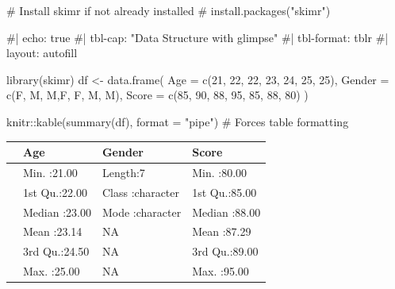\documentclass[
  man,
  floatsintext,
  longtable,
  nolmodern,
  notxfonts,
  notimes,
  colorlinks=true,linkcolor=blue,citecolor=blue,urlcolor=blue]{apa7}
\newenvironment{Shaded}{\begin{snugshade}}{\end{snugshade}}
\newcommand{\AttributeTok}[1]{\textcolor[rgb]{0.40,0.45,0.13}{#1}}
\newcommand{\CommentTok}[1]{\textcolor[rgb]{0.37,0.37,0.37}{#1}}
\newcommand{\DecValTok}[1]{\textcolor[rgb]{0.68,0.00,0.00}{#1}}
\newcommand{\FunctionTok}[1]{\textcolor[rgb]{0.28,0.35,0.67}{#1}}
\newcommand{\NormalTok}[1]{\textcolor[rgb]{0.00,0.23,0.31}{#1}}
\newcommand{\OtherTok}[1]{\textcolor[rgb]{0.00,0.23,0.31}{#1}}
\newcommand{\SpecialCharTok}[1]{\textcolor[rgb]{0.37,0.37,0.37}{#1}}
\newcommand{\StringTok}[1]{\textcolor[rgb]{0.13,0.47,0.30}{#1}}
\begin{document}
\begin{Shaded}
\begin{Highlighting}[]
\CommentTok{\# Install skimr if not already installed}
\CommentTok{\# install.packages("skimr")}

\CommentTok{\#| echo: true}
\CommentTok{\#| tbl{-}cap: "Data Structure with glimpse"}
\CommentTok{\#| tbl{-}format: tblr}
\CommentTok{\#| layout: autofill}

\FunctionTok{library}\NormalTok{(skimr)}
\NormalTok{df }\OtherTok{\textless{}{-}} \FunctionTok{data.frame}\NormalTok{(}
  \AttributeTok{Age =} \FunctionTok{c}\NormalTok{(}\DecValTok{21}\NormalTok{, }\DecValTok{22}\NormalTok{, }\DecValTok{22}\NormalTok{, }\DecValTok{23}\NormalTok{, }\DecValTok{24}\NormalTok{, }\DecValTok{25}\NormalTok{, }\DecValTok{25}\NormalTok{),}
  \AttributeTok{Gender =} \FunctionTok{c}\NormalTok{(}\StringTok{\textquotesingle{}F\textquotesingle{}}\NormalTok{, }\StringTok{\textquotesingle{}M\textquotesingle{}}\NormalTok{, }\StringTok{\textquotesingle{}M\textquotesingle{}}\NormalTok{,}\StringTok{\textquotesingle{}F\textquotesingle{}}\NormalTok{, }\StringTok{\textquotesingle{}F\textquotesingle{}}\NormalTok{, }\StringTok{\textquotesingle{}M\textquotesingle{}}\NormalTok{, }\StringTok{\textquotesingle{}M\textquotesingle{}}\NormalTok{),}
  \AttributeTok{Score =} \FunctionTok{c}\NormalTok{(}\DecValTok{85}\NormalTok{, }\DecValTok{90}\NormalTok{, }\DecValTok{88}\NormalTok{, }\DecValTok{95}\NormalTok{, }\DecValTok{85}\NormalTok{, }\DecValTok{88}\NormalTok{, }\DecValTok{80}\NormalTok{)}
\NormalTok{)}

\NormalTok{knitr}\SpecialCharTok{::}\FunctionTok{kable}\NormalTok{(}\FunctionTok{summary}\NormalTok{(df), }\AttributeTok{format =} \StringTok{"pipe"}\NormalTok{)  }\CommentTok{\# Forces table formatting}
\end{Highlighting}
\end{Shaded}

\begin{longtable}[]{@{}llll@{}}
\toprule\noalign{}
& Age & Gender & Score \\
\midrule\noalign{}
\endhead
\bottomrule\noalign{}
\endlastfoot
& Min. :21.00 & Length:7 & Min. :80.00 \\
& 1st Qu.:22.00 & Class :character & 1st Qu.:85.00 \\
& Median :23.00 & Mode :character & Median :88.00 \\
& Mean :23.14 & NA & Mean :87.29 \\
& 3rd Qu.:24.50 & NA & 3rd Qu.:89.00 \\
& Max. :25.00 & NA & Max. :95.00 \\
\end{longtable}
\end{document}

